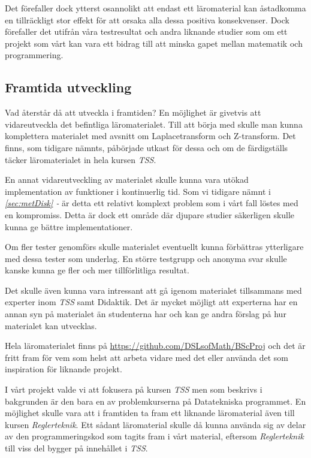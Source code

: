 \documentclass[12pt,a4paper,twoside,openright]{article}
\begin{document}
Det förefaller dock ytterst osannolikt att endast ett läromaterial
kan åstadkomma en tillräckligt stor effekt för att orsaka alla
dessa positiva konsekvenser. Dock förefaller det utifrån
våra testresultat och andra liknande studier som om ett
projekt som vårt kan vara ett bidrag till att minska
gapet mellan matematik och programmering.

\subsection{Framtida utveckling}
Vad återstår då att utveckla i framtiden? En möjlighet är givetvis att
vidareutveckla det befintliga läromaterialet. Till att börja med
skulle man kunna komplettera materialet med avsnitt om
Laplacetransform och Z-transform. Det finns, som tidigare nämnts,
påbörjade utkast för dessa och om de färdigställs täcker
läromaterialet in hela kursen \textit{TSS}.

En annat vidareutveckling av materialet skulle kunna vara utökad
implementation av funktioner i kontinuerlig tid. Som vi tidigare nämnt
i \textit{\ref{sec:metDisk} - } är detta ett
relativt komplext problem som i vårt fall löstes med en
kompromiss. Detta är dock ett område där djupare studier säkerligen
skulle kunna ge bättre implementationer.

Om fler tester genomförs skulle materialet eventuellt kunna förbättras
ytterligare med dessa tester som underlag. En större testgrupp och
anonyma svar skulle kanske kunna ge fler och mer tillförlitliga
resultat.

Det skulle även kunna vara intressant att gå igenom materialet
tillsammans med experter inom \textit{TSS} samt Didaktik. Det är
mycket möjligt att experterna har en annan syn på materialet än
studenterna har och kan ge andra förslag på hur materialet kan
utvecklas.

Hela läromaterialet finns på \url{https://github.com/DSLsofMath/BScProj} och det är
fritt fram för vem som helst att arbeta vidare med det eller använda
det som inspiration för liknande projekt.

I vårt projekt valde vi att fokusera på kursen \textit{TSS} men som
beskrivs i bakgrunden är den bara en av problemkurserna på
Datatekniska programmet. En möjlighet skulle vara att i framtiden ta
fram ett liknande läromaterial även till kursen
\textit{Reglerteknik}. Ett sådant läromaterial skulle då kunna använda
sig av delar av den programmeringskod som tagits fram i vårt material,
eftersom \textit{Reglerteknik} till viss del bygger på innehållet i
\textit{TSS}.
\end{document}
